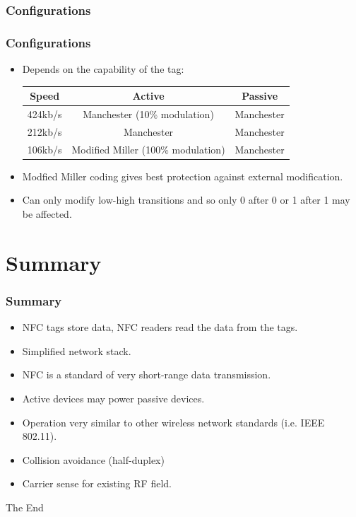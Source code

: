 \documentclass{beamer}
\begin{document}
\subsubsection{Configurations}
\begin{frame}
\frametitle{Configurations}
\begin{itemize}
\item Depends on the capability of the tag:
\begin{tabular}{|c|c|c|}
\hline
Speed & Active & Passive\\
\hline
\hline
424kb/s & Manchester (10\% modulation) & Manchester\\
\hline
212kb/s & Manchester & Manchester\\
\hline
106kb/s & Modified Miller (100\% modulation) & Manchester\\
\hline
\end{tabular}
\item Modfied Miller coding gives best protection against external modification.
\item Can only modify low-high transitions and so only 0 after 0 or 1 after 1 may be affected.
\end{itemize}
\end{frame}
\section{Summary}
\begin{frame}
\frametitle{Summary}
\begin{itemize}
\item NFC tags store data, NFC readers read the data from the tags.
\item Simplified network stack.
\item NFC is a standard of very short-range data transmission.
\item Active devices may power passive devices.
\item Operation very similar to other wireless network standards (i.e. IEEE 802.11).
\item Collision avoidance (half-duplex)
\item Carrier sense for existing RF field.
\end{itemize}
\end{frame}
\begin{frame} 
\Huge{\centerline{The End}}
\end{frame}
\end{document}
